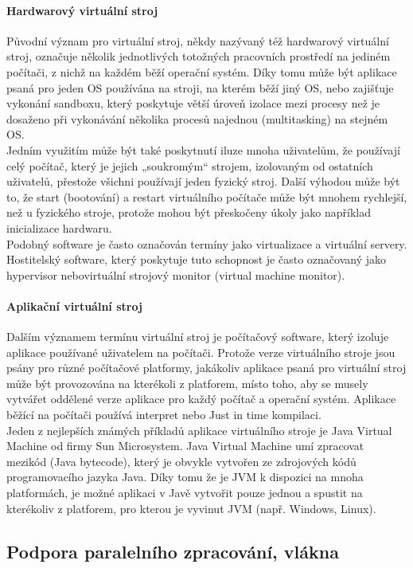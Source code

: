 \documentclass[10pt,a4paper]{article}
\begin{document}
\paragraph{Hardwarový virtuální stroj}
Původní význam pro virtuální stroj, někdy nazývaný též hardwarový virtuální stroj, označuje několik jednotlivých totožných pracovních prostředí na jediném počítači, z nichž na každém běží operační systém. Díky tomu může být aplikace psaná pro jeden OS používána na stroji, na kterém běží jiný OS, nebo zajišťuje vykonání sandboxu, který poskytuje větší úroveň izolace mezi procesy než je dosaženo při vykonávání několika procesů najednou (multitasking) na stejném OS.\\
Jedním využitím může být také poskytnutí iluze mnoha uživatelům, že používají celý počítač, který je jejich „soukromým“ strojem, izolovaným od ostatních uživatelů, přestože všichni používají jeden fyzický stroj. Další výhodou může být to, že start (bootování) a restart virtuálního počítače může být mnohem rychlejší, než u fyzického stroje, protože mohou být přeskočeny úkoly jako například inicializace hardwaru.\\
Podobný software je často označován termíny jako virtualizace a virtuální servery. Hostitelský software, který poskytuje tuto schopnost je často označovaný jako hypervisor nebovirtuální strojový monitor (virtual machine monitor).
\paragraph{Aplikační virtuální stroj}
Dalším významem termínu virtuální stroj je počítačový software, který izoluje aplikace používané uživatelem na počítači. Protože verze virtuálního stroje jsou psány pro různé počítačové platformy, jakákoliv aplikace psaná pro virtuální stroj může být provozována na kterékoli z platforem, místo toho, aby se musely vytvářet oddělené verze aplikace pro každý počítač a operační systém. Aplikace běžící na počítači používá interpret nebo Just in time kompilaci.\\
Jeden z nejlepších známých příkladů aplikace virtuálního stroje je Java Virtual Machine od firmy Sun Microsystem. Java Virtual Machine umí zpracovat mezikód (Java bytecode), který je obvykle vytvořen ze zdrojových kódů programovacího jazyka Java. Díky tomu že je JVM k dispozici na mnoha platformách, je možné aplikaci v Javě vytvořit pouze jednou a spustit na kterékoliv z platforem, pro kterou je vyvinut JVM (např. Windows, Linux).
\subsection{Podpora paralelního zpracování, vlákna}
\end{document}
